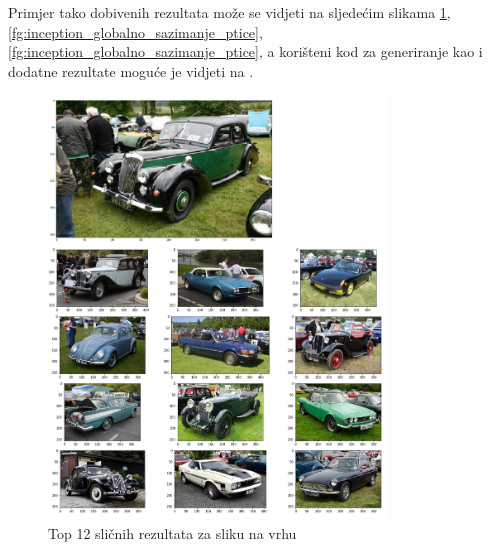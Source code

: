 \documentclass[times, utf8, proizvoljni, numeric]{fer}
\begin{document}
Primjer tako dobivenih rezultata može se vidjeti na sljedećim slikama \ref{fg:inception_globalno_sazimanje_auti}, \ref{fg:inception_globalno_sazimanje_ptice}, \ref{fg:inception_globalno_sazimanje_ptice}, a korišteni kod za generiranje kao i dodatne rezultate moguće je vidjeti na \cite{AVSP}.

\begin{figure}[H]
	\begin{center}
		\captionsetup{justification=centering}
		\includegraphics[width=0.8\textwidth]{./imgs/inception_globalno_sazimanje_auti.png}
		\caption{Top 12 sličnih rezultata za sliku na vrhu}
		\label{fg:inception_globalno_sazimanje_auti}
	\end{center}
\end{figure}
\end{document}
